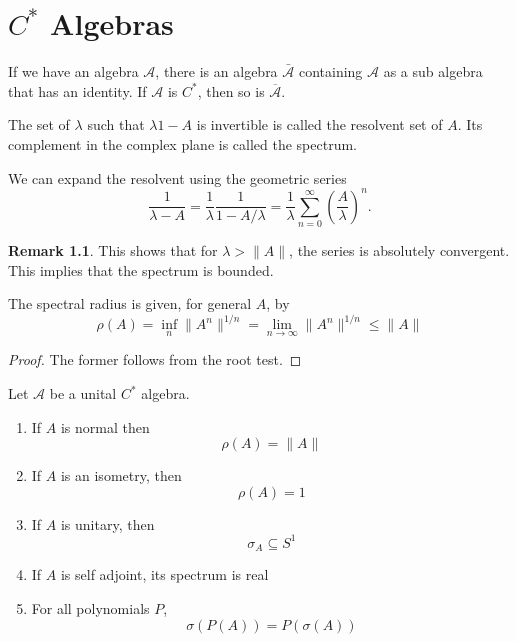 \documentclass[twoside,symmetric, openany, 12pt]{./tuftebook}
\theoremstyle{definition}
\newtheorem{Remark}[Theorem]{Remark}
\theoremstyle{definition}
\theoremstyle{definition}
\begin{document}
\chapter{$C^*$ Algebras}
\begin{Theorem}
	If we have an algebra $\mathcal{A}$, there is an algebra $\bar{\mathcal{A}}$ containing $\mathcal{A}$ as a sub algebra that has an identity. If $\mathcal{A}$ is $C^*$, then so is $\overline{\mathcal{A}}$.
\end{Theorem}
\begin{Definition}
	The set of $\lambda$ such that $\lambda 1 - A$ is invertible is called the resolvent set of $A$. Its complement in the complex plane is called the spectrum.
\end{Definition}
\begin{Definition}
	We can expand the resolvent using the geometric series
	\[
	\frac{1}{\lambda - A}= \frac{1}{\lambda}\frac{1}{1 - A / \lambda} = \frac{1}{\lambda}\sum_{n=0}^{\infty} \left( \frac{A}{\lambda} \right)^n
	.\] 
\end{Definition}
\begin{Remark}
	This shows that for $\lambda>\|A\|$, the series is absolutely convergent. This implies that the spectrum is bounded.
\end{Remark}
\begin{Theorem}
	The spectral radius is given, for general $A$, by
	\[\rho(A) = \inf_n \|A^n\|^{1/n} = \lim_{n\to \infty} \|A^n\|^{1/n} \le \|A\|\]
\end{Theorem}
\begin{proof}
	The former follows from the root test. 
\end{proof}
\begin{Theorem}
	Let $\mathcal{A}$ be a unital $C^*$ algebra. 
	\begin{enumerate}
		\item If $A$ is normal then
		\[\rho(A) = \|A\|\]
		\item If $A$ is an isometry, then
		\[\rho(A) = 1\]
		\item If $A$ is unitary, then
		\[\sigma_A\subseteq S^1\]
		\item If $A$ is self adjoint, its spectrum is real
		\item For all polynomials $P$,
		\[\sigma(P(A))= P(\sigma(A))\]
	\end{enumerate}
\end{Theorem}
\end{document}
